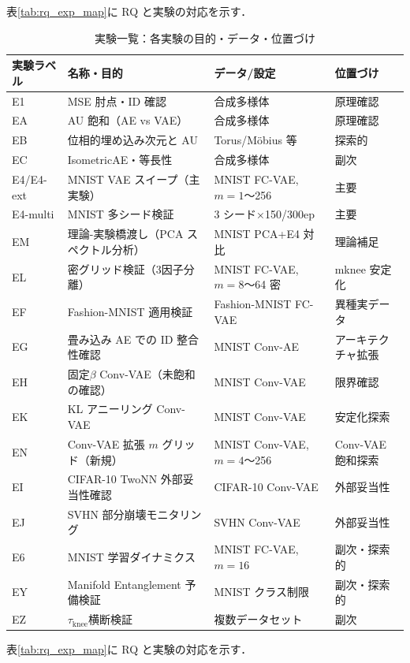 \documentclass[11pt,a4paper]{jsarticle}
\begin{document}
表\ref{tab:rq_exp_map}に RQ と実験の対応を示す．

\begin{table}[H]
\centering
\caption{実験一覧：各実験の目的・データ・位置づけ}
\label{tab:exp_list}
\small
\begin{tabular}{llll}
\toprule
実験ラベル & 名称・目的 & データ/設定 & 位置づけ \\
\midrule
E1 & MSE 肘点・ID 確認 & 合成多様体 & 原理確認 \\
EA & AU 飽和（AE vs VAE） & 合成多様体 & 原理確認 \\
EB & 位相的埋め込み次元と AU & Torus/Möbius 等 & 探索的 \\
EC & IsometricAE・等長性 & 合成多様体 & 副次 \\
E4/E4-ext & MNIST VAE スイープ（主実験） & MNIST FC-VAE, $m=1$〜256 & 主要 \\
E4-multi & MNIST 多シード検証 & 3 シード×150/300ep & 主要 \\
EM & 理論-実験橋渡し（PCA スペクトル分析） & MNIST PCA+E4 対比 & 理論補足 \\
EL & 密グリッド検証（3因子分離） & MNIST FC-VAE, $m=8$〜64 密 & mknee 安定化 \\
EF & Fashion-MNIST 適用検証 & Fashion-MNIST FC-VAE & 異種実データ \\
EG & 畳み込み AE での ID 整合性確認 & MNIST Conv-AE & アーキテクチャ拡張 \\
EH & 固定$\beta$ Conv-VAE（未飽和の確認） & MNIST Conv-VAE & 限界確認 \\
EK & KL アニーリング Conv-VAE & MNIST Conv-VAE & 安定化探索 \\
EN & Conv-VAE 拡張 $m$ グリッド（新規） & MNIST Conv-VAE, $m=4$〜256 & Conv-VAE 飽和探索 \\
EI & CIFAR-10 TwoNN 外部妥当性確認 & CIFAR-10 Conv-VAE & 外部妥当性 \\
EJ & SVHN 部分崩壊モニタリング & SVHN Conv-VAE & 外部妥当性 \\
E6 & MNIST 学習ダイナミクス & MNIST FC-VAE, $m=16$ & 副次・探索的 \\
EY & Manifold Entanglement 予備検証 & MNIST クラス制限 & 副次・探索的 \\
EZ & $\tau_\mathrm{knee}$横断検証 & 複数データセット & 副次 \\
\bottomrule
\end{tabular}
\end{table}

表\ref{tab:rq_exp_map}に RQ と実験の対応を示す．
\end{document}
